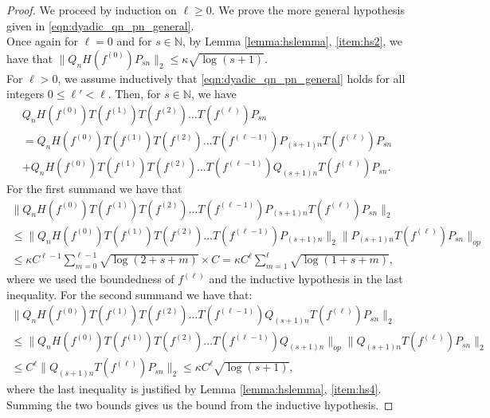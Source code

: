 \documentclass[11pt]{amsart}
\theoremstyle{plain}
\theoremstyle{remark}
\numberwithin{equation}{section}
\begin{document}
\begin{proof}
We proceed by induction on $\ell\geq 0$. We prove the more general hypothesis given in \eqref{eqn:dyadic_qn_pn_general}.
%
\medskip
%
\\Once again for $\ell=0$ and
for $s\in\mathbb{N}$, by Lemma \ref{lemma:hslemma}, \eqref{item:hs2}, we have that
$\|Q_nH(f^{(0)}) P_{sn}\|_2\leq  
 \kappa\sqrt{\log(s+1)}.
$
%
%
%
\medskip
%
\\For $\ell>0$, we assume inductively that \eqref{eqn:dyadic_qn_pn_general} holds for all integers $0\leq\ell'<\ell$. 
Then, for $s\in\mathbb{N}$, we have
\begin{multline}
Q_n H(f^{(0)}) T(f^{(1)}) T(f^{(2)})\ldots T(f^{(\ell)})P_{sn}
\\= Q_n H(f^{(0)}) T(f^{(1)}) T(f^{(2)})\ldots T(f^{(\ell-1)})P_{(s+1)n} T(f^{(\ell)})P_{sn}
\\+
 Q_n H(f^{(0)}) T(f^{(1)}) T(f^{(2)})\ldots T(f^{(\ell-1)})Q_{(s+1)n} T(f^{(\ell)})P_{sn}.
\end{multline}
For the first summand we have that
\begin{multline}
 \|Q_n H(f^{(0)}) T(f^{(1)}) T(f^{(2)})\ldots T(f^{(\ell-1)})P_{(s+1)n} T(f^{(\ell)})P_{sn}\|_2
\\\leq 
 \|Q_n H(f^{(0)}) T(f^{(1)}) T(f^{(2)})\ldots T(f^{(\ell-1)}) P_{(s+1)n}\|_2 \|P_{(s+1)n}T(f^{(\ell)})P_{sn}\|_{op}
 \\ \leq  \kappa C^{\ell-1} \sum_{m=0}^{\ell-1}\sqrt{\log(2+s+m)}\times C
 =\kappa C^{\ell} \sum_{m=1}^{\ell}\sqrt{\log(1+s+m)},
\end{multline}
where we used the boundedness of $f^{(\ell)}$ and the inductive hypothesis in the last inequality. For the second summand we have that:
\begin{multline}
\|Q_n H(f^{(0)}) T(f^{(1)}) T(f^{(2)})\ldots T(f^{(\ell-1)}) Q_{(s+1)n} T(f^{(\ell)})P_{sn}\|_2
\\ \leq
 \|Q_n H(f^{(0)}) T(f^{(1)}) T(f^{(2)})\ldots T(f^{(\ell-1)})  Q_{(s+1)n}\|_{op}
\|Q_{(s+1)n}T(f^{(\ell)})P_{sn}\|_2
\\ \leq
 C^{\ell}  \|Q_{(s+1)n}T(f^{(\ell)})P_{sn}\|_2
 \leq \kappa C^{\ell} \sqrt{\log(s+1)},
\end{multline}
where the last inequality is justified by Lemma \ref{lemma:hslemma}, \eqref{item:hs4}.
Summing the two bounds gives us the bound from the inductive hypothesis.
%
\end{proof}


%
%
%
\end{document}
